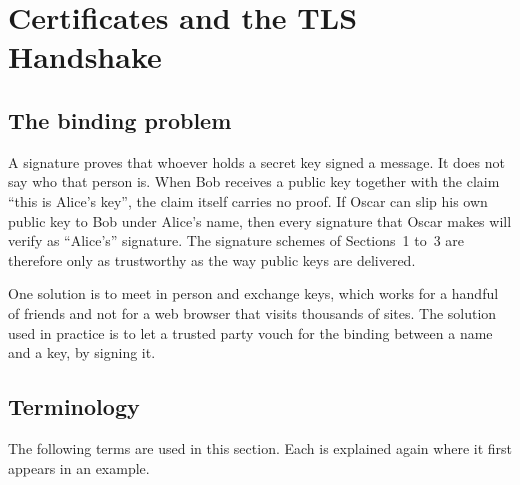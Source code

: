 \documentclass[11pt,a4paper]{article}
\theoremstyle{definition}
\begin{document}
\section{Certificates and the TLS Handshake}

\subsection{The binding problem}

A signature proves that whoever holds a secret key signed a message. It does not say who that person is. When Bob receives a public key together with the claim ``this is Alice's key'', the claim itself carries no proof. If Oscar can slip his own public key to Bob under Alice's name, then every signature that Oscar makes will verify as ``Alice's'' signature. The signature schemes of Sections~1 to~3 are therefore only as trustworthy as the way public keys are delivered.

One solution is to meet in person and exchange keys, which works for a handful of friends and not for a web browser that visits thousands of sites. The solution used in practice is to let a trusted party vouch for the binding between a name and a key, by signing it.

\subsection{Terminology}

The following terms are used in this section. Each is explained again where it first appears in an example.
\end{document}
